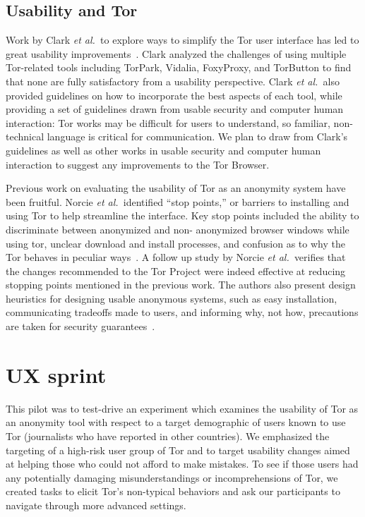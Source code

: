 \documentclass[letterpaper,twocolumn,11pt]{article}
\def\etal{{\it et al.~}}
\begin{document}
\subsection{Usability and Tor}
\indent \indent  Work by Clark \etal to explore ways to simplify the Tor user interface
has led to great usability improvements~\cite{clark2007usability}.  Clark analyzed the challenges 
of using multiple Tor-related tools including TorPark, Vidalia, FoxyProxy, and TorButton to find that
none are fully satisfactory from a usability perspective.  Clark \etal also provided guidelines on 
how to incorporate the best aspects of each tool, while providing a set of guidelines drawn from
usable security and computer human interaction: Tor works may be difficult for users to understand, 
so familiar, non-technical language is critical for communication. We plan to draw from Clark's
guidelines as well as other works in usable security and computer human interaction to suggest
any improvements to the Tor Browser. 

Previous work on evaluating the usability of Tor as an anonymity system have been fruitful. 
Norcie \etal identified ``stop points,'' or barriers to installing and using Tor to help streamline
the interface. Key stop points included the ability to discriminate between anonymized and non-
anonymized browser windows while using tor, unclear download and install processes, and 
confusion as to why the Tor behaves in peculiar ways~\cite{norcie2012eliminating}. A follow up
study by Norcie \etal verifies that the changes recommended to the Tor Project were indeed 
effective at reducing stopping points mentioned in the previous work. The authors also present
design heuristics for designing usable anonymous systems, such as easy installation, communicating
tradeoffs made to users, and informing why, not how, precautions are taken for security guarantees~\cite{norcie2014johnny}. 

\appendix

\section{UX sprint}
\label{sec:pilot}
\indent \indent This pilot was to test-drive an experiment which examines the usability of Tor as an anonymity tool
with respect to a target demographic of users known to use Tor (journalists who have reported in other
countries). We emphasized the targeting of a high-risk user group of Tor and to 
target usability changes aimed at helping those who could not afford to make mistakes. To see 
if those users had any potentially damaging misunderstandings or incomprehensions of Tor, 
we created tasks to elicit Tor's non-typical behaviors and ask our participants to
navigate through more advanced settings. 
\end{document}
